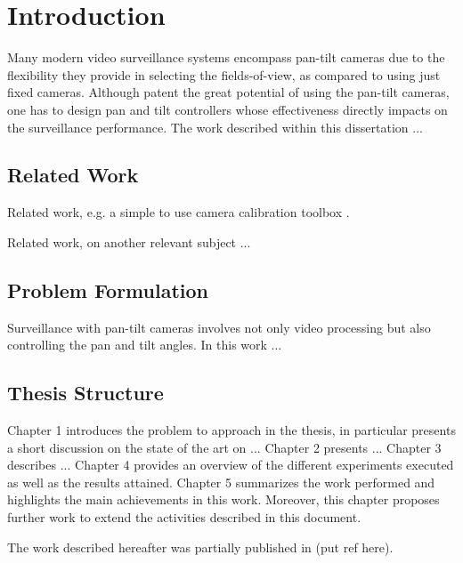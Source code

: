 \chapter{Introduction}

Many modern video surveillance systems encompass pan-tilt cameras due to the flexibility they provide in selecting the fields-of-view, as compared to using just fixed cameras. Although patent the great potential of using the pan-tilt cameras, one has to design pan and tilt controllers whose effectiveness directly impacts on the surveillance performance.
%
The work described within this dissertation ...


\section{Related Work} 

Related work, e.g. a simple to use camera calibration toolbox \cite{Bouguet}.

Related work, on another relevant subject ...


\section{Problem Formulation} 


Surveillance with pan-tilt cameras involves not only video processing but also controlling the pan and tilt angles. In this work ...


\section{Thesis Structure} 

Chapter 1 introduces the problem to approach in the thesis, in particular presents a short discussion on the state of the art on ... 
%
Chapter 2 presents ...
%
Chapter 3 describes ...
%
Chapter 4 provides an overview of the different experiments executed as well as the results attained.
%
Chapter 5 summarizes the work performed and highlights the main achievements in this work. Moreover, this chapter proposes further work to extend the activities described in this document.

The work described hereafter was partially published in (put ref here).
